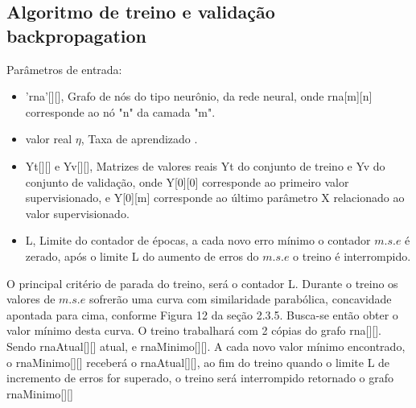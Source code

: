 \documentclass[	12pt, Times, openright, twoside, a4paper, english, brazil]{abntex2}
\begin{document}
        \subsection{Algoritmo de treino e validação backpropagation}
            Parâmetros de entrada:
            \begin{itemize}
                \item 'rna'[][], Grafo de nós do tipo neurônio, da rede neural, onde rna[m][n] corresponde ao nó "n" da camada "m".
                \item valor real $\eta$, Taxa de aprendizado .
                \item Yt[][] e Yv[][], Matrizes de valores reais Yt do conjunto de treino e Yv do conjunto de validação, onde Y[0][0] corresponde ao primeiro valor supervisionado, e Y[0][m] corresponde ao último parâmetro X relacionado ao valor supervisionado.
                \item L, Limite do contador de épocas, a cada novo erro mínimo o contador $m.s.e$ é zerado, após o limite L do aumento de erros do $m.s.e$ o treino é interrompido.                
            \end{itemize}

            O principal critério de parada do treino, será o contador L.
            Durante o treino os valores de $m.s.e$ sofrerão uma curva com similaridade parabólica, concavidade apontada para cima, conforme Figura 12 da seção 2.3.5. Busca-se então obter o valor mínimo desta curva.
            O treino trabalhará com 2 cópias do grafo rna[][]. Sendo rnaAtual[][] atual, e rnaMinimo[][].
			A cada novo valor mínimo encontrado, o rnaMinimo[][] receberá o rnaAtual[][], ao fim do treino quando o limite L de incremento de erros for superado, o treino será interrompido retornado o grafo rnaMinimo[][]
\end{document}
